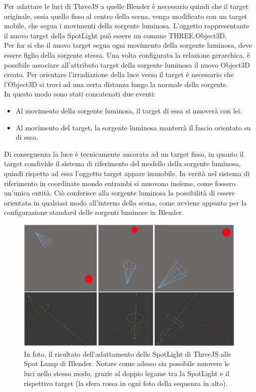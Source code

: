 Per adattare le luci di ThreeJS a quelle Blender è necessario quindi che il target originale, ossia quello fisso al centro della scena, venga modificato con un target mobile, che segua i movimenti della sorgente luminosa. L’oggetto rappresentante il nuovo target della SpotLight può essere un comune THREE.Object3D.
\\
Per far si che il nuovo target segua ogni movimento della sorgente luminosa, deve essere figlio della sorgente stessa. Una volta configurata la relazione gerarchica, è possibile associare all’attributo target della sorgente luminosa il nuovo Object3D creato. Per orientare l’irradiazione della luce verso il target è necessario che l’Object3D si trovi ad una certa distanza lungo la normale della sorgente.
\\
In questo modo sono stati concatenati due eventi:
\begin{itemize}
\item Al movimento della sorgente luminosa, il target di essa si muoverà con lei.
\item Al movimento del target, la sorgente luminosa manterrà il fascio orientato su di esso.
\end{itemize}
Di conseguenza la luce è tecnicamente ancorata ad un target fisso, in quanto il target condivide il sistema di riferimento del modello della sorgente luminosa, quindi rispetto ad essa l’oggetto target appare immobile. In verità nel sistema di riferimento in coordinate mondo entrambi si muovono insieme, come fossero un’unica entità. Ciò conferisce alla sorgente luminosa la possibilità di essere orientata in qualsiasi modo all’interno della scena, come avviene appunto per la configurazione standard delle sorgenti luminose in Blender.
\\
\begin{figure}[h]
 \centering
 \includegraphics[width=1\linewidth]{images/chapter_creazione_scena/editor_6.png}\hfill
 \caption[Adattamento illuminazione]{In foto, il risultato dell'adattamento delle SpotLight di ThreeJS alle Spot Lamp di Blender. Notare come adesso sia possibile muovere le luci nello stesso modo, grazie al doppio legame tra la SpotLight e il rispettivo target (la sfera rossa in ogni foto della sequenza in alto).}
 \label{fig:editor_6}
\end{figure} 


